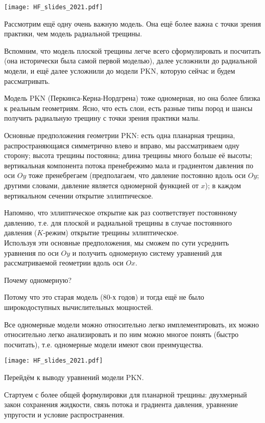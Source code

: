 \documentclass[main.tex]{subfiles}
\begin{document}
\texttt{[image: HF\_slides\_2021.pdf]}

Рассмотрим ещё одну очень важную модель.
Она ещё более важна с точки зрения практики, чем модель радиальной трещины.

Вспомним, что модель плоской трещины легче всего сформулировать и посчитать (она исторически была самой первой моделью), далее усложнили до радиальной модели, и ещё далее усложнили до модели PKN, которую сейчас и будем рассматривать.

Модель PKN (Перкинса-Керна-Нордгрена) тоже одномерная, но она более близка к реальным геометриям.
Ясно, что есть слои, есть разные типы пород и шансы получить радиальную трещину с точки зрения практики малы.

Основные предположения геометрии PKN: есть одна планарная трещина, распространяющаяся симметрично влево и вправо, мы рассматриваем одну сторону; высота трещины постоянна; длина трещины много больше её высоты; вертикальная компонента потока пренебрежимо мала и градиентом давления по оси $Oy$ тоже пренебрегаем (предполагаем, что давление постоянно вдоль оси $Oy$; другими словами, давление является одномерной функцией от $x$); в каждом вертикальном сечении открытие эллиптическое.

Напомню, что эллиптическое открытие как раз соответствует постоянному давлению, т.е. для плоской и радиальной трещины в случае постоянного давления ($K$-режим) открытие трещины эллиптическое.
\\

Используя эти основные предположения, мы сможем по сути усреднить уравнения по оси $Oy$ и получить одномерную систему уравнений для рассматриваемой геометрии вдоль оси $Ox$.

Почему одномерную?

Потому что это старая модель (80-х годов) и тогда ещё не было широкодоступных вычислительных мощностей.

Все одномерные модели можно относительно легко имплементировать, их можно относительно легко анализировать и по ним можно многое понять (быстро посчитать), т.е. одномерные модели имеют свои преимущества.

\texttt{[image: HF\_slides\_2021.pdf]}

Перейдём к выводу уравнений модели PKN.

Стартуем с более общей формулировки для планарной трещины: двухмерный закон сохранения жидкости, связь потока и градиента давления, уравнение упругости и условие распространения.
\end{document}
